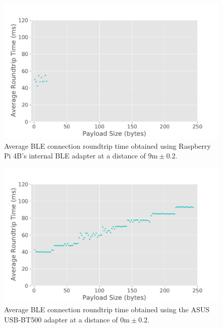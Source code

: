 \begin{figure}[H]
    \centering
    \includegraphics[width=0.75\linewidth]{images/ble-roundtrip-hci1-900cm.pdf}
    \caption[Average \acs{BLE} connection roundtrip time obtained using Raspberry Pi 4B's internal \acs{BLE} adapter at a distance of 9m.]{Average \acs{BLE} connection roundtrip time obtained using Raspberry Pi 4B's internal \acs{BLE} adapter at a distance of $9\text{m} \pm 0.2$.}
    \label{fig:ble-roundtrip-hci1-9m}
\end{figure}

\begin{figure}[H]
    \centering
    \includegraphics[width=0.75\linewidth]{images/ble-roundtrip-hci0-0cm.pdf}
    \caption[Average \acs{BLE} connection roundtrip time obtained using the ASUS USB-BT500 adapter at a distance of 0m.]{Average \acs{BLE} connection roundtrip time obtained using the ASUS USB-BT500 adapter at a distance of $0\text{m} \pm 0.2$.}
    \label{fig:ble-roundtrip-hci0-0m}
\end{figure}

